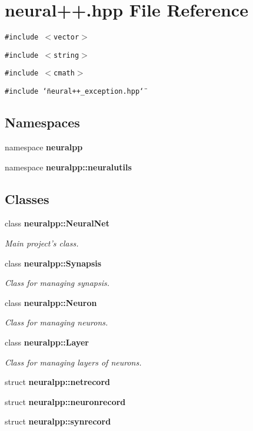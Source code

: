 \section{neural++.hpp File Reference}
\label{neural_09_09_8hpp}
{\tt \#include $<$vector$>$}\par
{\tt \#include $<$string$>$}\par
{\tt \#include $<$cmath$>$}\par
{\tt \#include \char`\"{}neural++\_\-exception.hpp\char`\"{}}\par
\subsection*{Namespaces}
\begin{CompactItemize}
\item 
namespace {\bf neuralpp}
\item 
namespace {\bf neuralpp::neuralutils}
\end{CompactItemize}
\subsection*{Classes}
\begin{CompactItemize}
\item 
class {\bf neuralpp::NeuralNet}
\begin{CompactList}\small\item\em Main project's class. \item\end{CompactList}\item 
class {\bf neuralpp::Synapsis}
\begin{CompactList}\small\item\em Class for managing synapsis. \item\end{CompactList}\item 
class {\bf neuralpp::Neuron}
\begin{CompactList}\small\item\em Class for managing neurons. \item\end{CompactList}\item 
class {\bf neuralpp::Layer}
\begin{CompactList}\small\item\em Class for managing layers of neurons. \item\end{CompactList}\item 
struct {\bf neuralpp::netrecord}
\item 
struct {\bf neuralpp::neuronrecord}
\item 
struct {\bf neuralpp::synrecord}
\end{CompactItemize}

